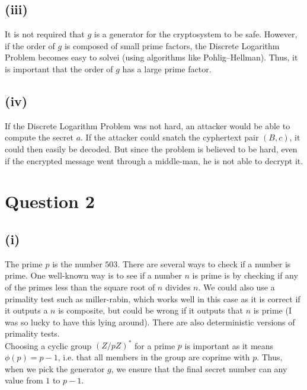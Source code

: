 \documentclass[a4paper, fleqn]{article}
\begin{document}
\subsection{(iii)}
It is not required that $g$ is a generator for the cryptosystem to be safe. However, if the order of $g$ is composed of small prime factors, the Discrete Logarithm Problem becomes easy to solvei (using algorithms like Pohlig–Hellman). Thus, it is important that the order of $g$ has a large prime factor.

\subsection{(iv)}
If the Discrete Logarithm Problem was not hard, an attacker would be able to compute the secret $a$. If the attacker could snatch the cyphertext pair $(B, c)$, it could then easily be decoded. But since the problem is believed to be hard, even if the encrypted message went through a middle-man, he is not able to decrypt it.

\section{Question 2}

\subsection{(i)}
The prime $p$ is the number $503$. There are several ways to check if a number is prime. One well-known way is to see if a number $n$ is prime is by checking if any of the primes less than the square root of $n$ divides $n$. We could also use a primality test such as miller-rabin, which works well in this case as it is correct if it outputs a $n$ is composite, but could be wrong if it outputs that $n$ is prime (I was so lucky to have this lying around). There are also deterministic versions of primality tests. \\
Choosing a cyclic group $(Z/pZ)^*$ for a prime $p$ is important as it means $\phi(p)=p-1$, i.e. that all members in the group are coprime with $p$. Thus, when we pick the generator $g$, we ensure that the final secret number can any value from $1$ to $p-1$.
\end{document}
